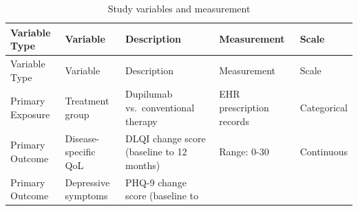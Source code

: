 \documentclass[
]{agujournal2019}
\begin{document}
\begin{longtable}[]{@{}
  >{\raggedright\arraybackslash}p{}
  >{\raggedright\arraybackslash}p{}
  >{\raggedright\arraybackslash}p{}
  >{\raggedright\arraybackslash}p{}
  >{\raggedright\arraybackslash}p{}@{}}
\caption{Study variables and
measurement}\label{tbl-variables}\tabularnewline
\toprule\noalign{}
\begin{minipage}[b]{\linewidth}\raggedright
Variable Type
\end{minipage} & \begin{minipage}[b]{\linewidth}\raggedright
Variable
\end{minipage} & \begin{minipage}[b]{\linewidth}\raggedright
Description
\end{minipage} & \begin{minipage}[b]{\linewidth}\raggedright
Measurement
\end{minipage} & \begin{minipage}[b]{\linewidth}\raggedright
Scale
\end{minipage} \\
\midrule\noalign{}
\endfirsthead
\toprule\noalign{}
\begin{minipage}[b]{\linewidth}\raggedright
Variable Type
\end{minipage} & \begin{minipage}[b]{\linewidth}\raggedright
Variable
\end{minipage} & \begin{minipage}[b]{\linewidth}\raggedright
Description
\end{minipage} & \begin{minipage}[b]{\linewidth}\raggedright
Measurement
\end{minipage} & \begin{minipage}[b]{\linewidth}\raggedright
Scale
\end{minipage} \\
\midrule\noalign{}
\endhead
\bottomrule\noalign{}
\endlastfoot
Primary Exposure & Treatment group & Dupilumab vs.~conventional therapy
& EHR prescription records & Categorical \\
Primary Outcome & Disease-specific QoL & DLQI change score (baseline to
12 months) & Range: 0-30 & Continuous \\
Primary Outcome & Depressive symptoms & PHQ-9 change score (baseline to

\end{longtable}
\end{document}
